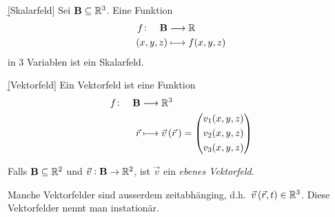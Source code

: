 \documentclass[12pt]{article}
\begin{document}
\begin{figure}[htbp!]
    \centering
\end{figure}

\begin{defn}{\b{[Skalarfeld]}} Sei $\mathbf{B}\subseteq\mathbb{R}^3$. Eine Funktion
    \begin{align}
        f\colon\quad \mathbf{B} & \longrightarrow\mathbb{R}    \\
        (x,y,z)                 & \longmapsto f(x,y,z)
    \end{align}
    in 3 Variablen ist ein Skalarfeld.
\end{defn}\vspace*{1em}

\begin{defn}{\b{[Vektorfeld]}} Ein Vektorfeld ist eine Funktion
    \begin{align}
        f\colon\quad \mathbf{B} & \longrightarrow\mathbb{R}^3                                \\
        \vec{r}                 & \longmapsto \vec{v}\,(\vec{r}\,)=\begin{pmatrix}
                                                                       v_1(x,y,z) \\[3pt]
                                                                       v_2(x,y,z) \\[3pt]
                                                                       v_3(x,y,z)
                                                                   \end{pmatrix}
    \end{align}
    \begin{rmk}{}{}
        Falls  $\mathbf{B}\subseteq\mathbb{R}^2$ und $\vec{v}: \mathbf{B}\to\mathbb{R}^2$, ist $\vec{v}$ ein \emph{ebenes Vektorfeld}.
    \end{rmk}
    \begin{rmk}{}{}
        Manche Vektorfelder sind ausserdem zeitabhänging, d.h.\ $\vec{v}\,(\vec{r},t)\in\mathbb{R}^3$. Diese Vektorfelder nennt man instationär.
    \end{rmk}
\end{defn}\vspace*{1em}
\end{document}
